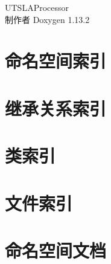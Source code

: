 \documentclass[twoside]{book}
\newcommand{\+}{\discretionary{\mbox{\scriptsize$\hookleftarrow$}}{}{}}
\newcommand{\clearemptydoublepage}{%
    \newpage{\pagestyle{empty}\cleardoublepage}%
  }
\begin{document}
  \raggedbottom
  \begin{CJK}{UTF8}{gbsn}
    \hypersetup{pageanchor=false,
                bookmarksnumbered=true,
                pdfencoding=unicode
               }
  \begin{titlepage}
  \vspace*{7cm}
  \begin{center}%
  {\Large UTSLAProcessor}\\
  \vspace*{1cm}
  {\large 制作者 Doxygen 1.13.2}\\
  \end{center}
  \end{titlepage}
  \clearemptydoublepage
  \tableofcontents
  \clearemptydoublepage
  \hypersetup{pageanchor=true}
\chapter{命名空间索引}

\chapter{继承关系索引}

\chapter{类索引}

\chapter{文件索引}

\chapter{命名空间文档}




\end{CJK}
\end{document}
